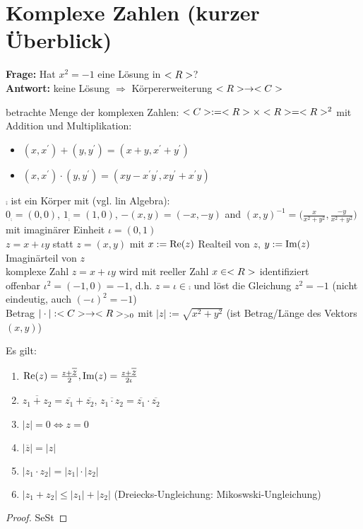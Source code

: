 \section{Komplexe Zahlen (kurzer Überblick)}

\textbf{Frage:} Hat $x^2 = -1$  eine Lösung in $<R>$? \\
\textbf{Antwort:} keine Lösung $\Rightarrow$ Körpererweiterung $<R> \to <C>$

\begin{*definition}
	betrachte Menge der komplexen Zahlen: $<C> := <R> \times <R> = <R>^2$ mit Addition und Multiplikation:
	\begin{itemize}
		\item $(x,x^{'}) + (y,y^{'}) = (x+y, x^{'} + y^{'})$
		\item $(x,x^{'}) \cdot (y,y^{'}) = (xy - x^{'}y^{'}, xy^{'}+x^{'}y)$
	\end{itemize}
\end{*definition}

$\comp$ ist ein Körper mit (vgl. lin Algebra):\\
$0_{\comp} = (0,0)$,  $1_{\comp} = (1,0)$, $-(x,y) = (-x,-y)$ and $(x,y)^{-1} = \bigg(\frac{x}{x^2+y^2},\frac{-y}{x^2+y^2}\bigg)$\\
mit imaginärer Einheit $\iota=(0,1)$\\
$z=x+\iota y$ statt $z=(x,y)$ mit $x:=\operatorname{Re}(z)$ Realteil von $z$, $y:= \operatorname{Im}(z)$ Imaginärteil von $z$\\
komplexe Zahl $z=x + \iota y$ wird mit reeller Zahl $x \in <R>$ identifiziert\\
offenbar $\iota^2=(-1,0)=-1$, d.h. $z=\iota \in \comp$ und löst die Gleichung $z^2=-1$ (nicht eindeutig, auch $(-\iota)^2 = -1$)\\
Betrag $|\cdot|: <C> \to <R>_{> 0}$ mit $|z|:= \sqrt{x^2+y^2}$ (ist Betrag/Länge des Vektors $(x,y)$)\\

\begin{proposition}
	Es gilt:
	\begin{enumerate}[label={\alph*)}]
		\item $\Realz(z) = \frac{z+\overline{z}}{2}, \Imag(z) = \frac{z+\overline{z}}{2\iota}$
		\item $\overline{z_1 + z_2} = \overline{z_1} + \overline{z_2}$, $\overline{z_1 \cdot z_2} = \overline{z_1} \cdot \overline{z_2}$
		\item $|z| = 0 \iff z=0$
		\item $|\overline{z}| = |z|$
		\item $|z_1 \cdot z_2| = |z_1| \cdot |z_2|$
		\item $|z_1 + z_2| \leq |z_1| + |z_2|$ (Dreiecks-Ungleichung: Mikoswski-Ungleichung)
	\end{enumerate}
\end{proposition}
\begin{proof}
	SeSt \QEDA
\end{proof}